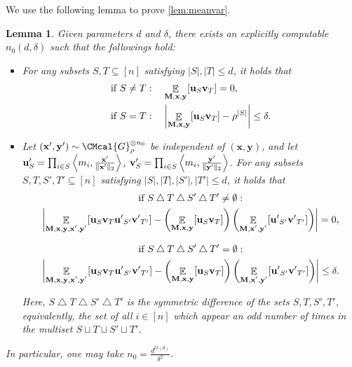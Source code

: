 \documentclass[11pt]{article}
\def\G{\CMcal{G}}
\theoremstyle{plain}
\newtheorem{lemma}[theorem]{Lemma}
\theoremstyle{definition}
\newcommand {\minusspace} {\: \! \!}
\newcommand {\Fn} [2] {\ensuremath{ #1 \minusspace \Br{ #2 } }}
\newcommand {\innerproduct} [2] {\ensuremath{\left \langle #1 , #2 \right \rangle}}
\newcommand {\br} [1] {\ensuremath{ \left( #1 \right) }}
\newcommand {\Br} [1] {\ensuremath{ \left[ #1 \right] }}
\DeclarePairedDelimiter{\norm}{\lVert}{\rVert}
\newcommand {\normsub} [2] {\ensuremath{ \norm{#1}_{#2} }}
\newcommand {\twonorm} [1] {\normsub{#1}{2}}
\newcommand {\ab} [1] {\ensuremath{ \left| #1 \right| }}
\DeclareMathOperator*{\bigE}{\mathbb{E}}
\newcommand {\expec} [2] {\Fn{\bigE_{\substack{#1}}}{#2}}
\newcommand{\randx}{\ensuremath{\mathbf{x}}}
\newcommand{\randy}{\ensuremath{\mathbf{y}}}
\newcommand{\randu}{\ensuremath{\mathbf{u}}}
\newcommand{\randv}{\ensuremath{\mathbf{v}}}
\newcommand{\1}{\mathbb{1}} %
\begin{document}
We use the following lemma to prove \cref{lem:meanvar}.
\begin{lemma}\cite[Lemma A.8,A.9]{Ghazi:2018:DRP:3235586.3235614}\label{lem:intermediate}
Given parameters $d$ and $\delta$, there exists an explicitly computable $n_0(d,\delta)$ such that the followings hold: 
\begin{itemize}
\item For any subsets $S,T\subseteq[n]$ satisfying $\ab{S},\ab{T}\leq d$, it holds that
\begin{align*}
&\text{if }S\ne T:\quad\expec{\mathbf{M},\mathbf{x},\mathbf{y}}{\mathbf\randu_S\mathbf\randv_T}=0,\\
&\text{if }S= T:\quad\ab{\expec{\mathbf{M},\mathbf{x},\mathbf{y}}{\mathbf\randu_S\mathbf\randv_T}-\rho^{\ab{S}}}\leq\delta.\\
\end{align*}

\item Let $(\randx',\randy')\sim\G_\rho^{\otimes n_0}$ be independent of $(\randx,\randy)$, and let $\mathbf\randu'_S=\prod_{i\in S}\innerproduct{m_i}{\frac{\randx'}{\twonorm{\randx'}}}$, $\mathbf\randv'_S=\prod_{i\in S}\innerproduct{m_i}{\frac{\randy'}{\twonorm{\randy'}}}$. For any subsets $S,T,S',T'\subseteq[n]$ satisfying $\ab{S},\ab{T},\ab{S'},\ab{T'}\leq d$, it holds that
\begin{multline*}
\text{if } S\bigtriangleup T\bigtriangleup S'\bigtriangleup T'\ne\emptyset:\\\ab{\expec{\mathbf{M},\mathbf{x},\mathbf{y},\mathbf{x'},\mathbf{y'}}{\mathbf\randu_S\mathbf\randv_T\mathbf{u'}_{S'}\mathbf{v'}_{T'}}-\br{\expec{\mathbf{M},\mathbf{x},\mathbf{y}}{\mathbf\randu_S\mathbf\randv_T}}\br{\expec{\mathbf{M},\mathbf{x'},\mathbf{y'}}{\mathbf{u'}_{S'}\mathbf{v'}_{T'}}}}=0,
\end{multline*}

\begin{multline*}
\text{if } S\bigtriangleup T\bigtriangleup S'\bigtriangleup T'=\emptyset:\\\ab{\expec{\mathbf{M},\mathbf{x},\mathbf{y},\mathbf{x'},\mathbf{y'}}{\mathbf\randu_S\mathbf\randv_T\mathbf{u'}_{S'}\mathbf{v'}_{T'}}-\br{\expec{\mathbf{M},\mathbf{x},\mathbf{y}}{\mathbf\randu_S\mathbf\randv_T}}\br{\expec{\mathbf{M},\mathbf{x'},\mathbf{y'}}{\mathbf{u'}_{S'}\mathbf{v'}_{T'}}}}\leq\delta.
\end{multline*}


Here, $S\bigtriangleup T\bigtriangleup S'\bigtriangleup T'$ is the symmetric difference of the sets $S,T,S',T'$, equivalently, the set of all $i\in[n]$ which appear an odd number of times in the multiset $S\sqcup T\sqcup S'\sqcup T'$.
\end{itemize}

In particular, one may take $n_0=\frac{d^{O(d)}}{\delta^2}$.
\end{lemma}
\end{document}

